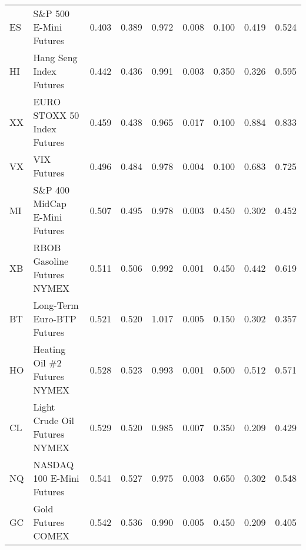 \begin{longtable}{llrrrrrrr}
\bottomrule
\endlastfoot
  ES &                        \makecell{S\&P 500 E-Mini\\Futures} &        0.403 &       0.389 &     0.972 &        0.008 &           0.100 &                0.419 &      0.524 \\
  HI &                        \makecell{Hang Seng Index\\Futures} &        0.442 &       0.436 &     0.991 &        0.003 &           0.350 &                0.326 &      0.595 \\
  XX &                    \makecell{EURO STOXX 50 Index\\Futures} &        0.459 &       0.438 &     0.965 &        0.017 &           0.100 &                0.884 &      0.833 \\
  VX &                                                VIX Futures &        0.496 &       0.484 &     0.978 &        0.004 &           0.100 &                0.683 &      0.725 \\
  MI &                 \makecell{S\&P 400 MidCap\\E-Mini Futures} &        0.507 &       0.495 &     0.978 &        0.003 &           0.450 &                0.302 &      0.452 \\
  XB &                    \makecell{RBOB Gasoline\\Futures NYMEX} &        0.511 &       0.506 &     0.992 &        0.001 &           0.450 &                0.442 &      0.619 \\
  BT &                     \makecell{Long-Term Euro-BTP\\Futures} &        0.521 &       0.520 &     1.017 &        0.005 &           0.150 &                0.302 &      0.357 \\
  HO &                  \makecell{Heating Oil \#2\\Futures NYMEX} &        0.528 &       0.523 &     0.993 &        0.001 &           0.500 &                0.512 &      0.571 \\
  CL &                  \makecell{Light Crude Oil\\Futures NYMEX} &        0.529 &       0.520 &     0.985 &        0.007 &           0.350 &                0.209 &      0.429 \\
  NQ &                      \makecell{NASDAQ 100 E-Mini\\Futures} &        0.541 &       0.527 &     0.975 &        0.003 &           0.650 &                0.302 &      0.548 \\
  GC &                                         Gold Futures COMEX &        0.542 &       0.536 &     0.990 &        0.005 &           0.450 &                0.209 &      0.405 \\

\end{longtable}
